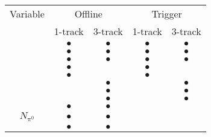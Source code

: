 \begin{tabular}{c|cc|cc}
  Variable & \multicolumn{2}{c|}{Offline}      & \multicolumn{2}{c}{Trigger} \\
                       &  1-track  & 3-track   & 1-track   & 3-track   \\ 
  \hline
  \centEnergyFrac{}    & $\bullet$ & $\bullet$ & $\bullet$ & $\bullet$ \\
  \leadTrackMomFrac{}  & $\bullet$ & $\bullet$ & $\bullet$ & $\bullet$ \\
  \trkAvgDist{}        & $\bullet$ & $\bullet$ & $\bullet$ & $\bullet$ \\
  \ipSigLeadTrk{}      & $\bullet$ &           & $\bullet$ &           \\
  \numIsoTrack{}       & $\bullet$ &           & $\bullet$ &           \\
  \dRmax{}             &           & $\bullet$ &           & $\bullet$ \\
  \trkFlightPathSig{}  &           & $\bullet$ &           & $\bullet$ \\
  \massTrkSys{}        &           & $\bullet$ &           & $\bullet$ \\
  \massTrkPizeroSys{}  & $\bullet$ & $\bullet$ &           &           \\
  $N_{\mathrm{\pi^0}}$ & $\bullet$ & $\bullet$ &           &           \\
  \Etratio{}           & $\bullet$ & $\bullet$ &           &           \\
\end{tabular}

